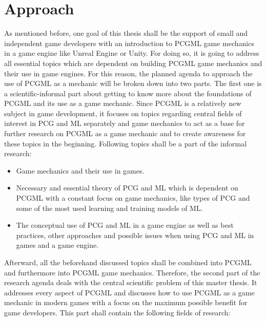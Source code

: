 \documentclass[MGS,Master,english]{twbook}%
\begin{document}
\section{Approach}
As mentioned before, one goal of this thesis shall be the support of small and independent game developers with an introduction to PCGML game mechanics in a game engine like Unreal Engine or Unity. For doing so, it is going to address all essential topics which are dependent on building PCGML game mechanics and their use in game engines. For this reason, the planned agenda to approach the use of PCGML as a mechanic will be broken down into two parts. The first one is a scientific-informal part about getting to know more about the foundations of \ac{PCGML} and its use as a game mechanic. Since \ac{PCGML} is a relatively new subject in game development, it focuses on topics regarding central fields of interest in \ac{PCG} and \ac{ML} separately and game mechanics to act as a base for further research on \ac{PCGML} as a game mechanic and to create awareness for these topics in the beginning. Following topics shall be a part of the informal research:
\begin{itemize}
	\item Game mechanics and their use in games.
	\item Necessary and essential theory of PCG and ML which is dependent on PCGML with a constant focus on game mechanics, like types of PCG and some of the most used learning and training models of ML.
	\item The conceptual use of PCG and ML in a game engine as well as best practices, other approaches and possible issues when using PCG and ML in games and a game engine.
\end{itemize}
Afterward, all the beforehand discussed topics shall be combined into PCGML and furthermore into PCGML game mechanics. Therefore, the second part of the research agenda deals with the central scientific problem of this master thesis. It addresses every aspect of \ac{PCGML} and discusses how to use \ac{PCGML} as a game mechanic in modern games with a focus on the maximum possible benefit for game developers. This part shall contain the following fields of research: 
\end{document}
